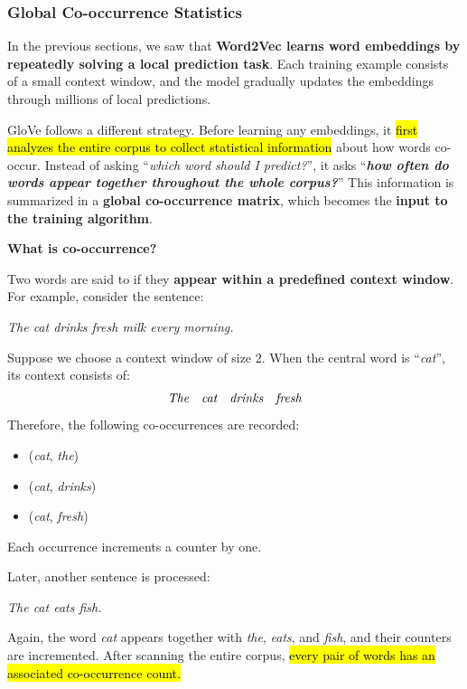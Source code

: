 \subsubsection{Global Co-occurrence Statistics}\label{sec:global-co-occurrence-statistics}

In the previous sections, we saw that \textbf{Word2Vec learns word embeddings by repeatedly solving a local prediction task}. Each training example consists of a small context window, and the model gradually updates the embeddings through millions of local predictions.

\highspace
GloVe follows a different strategy. Before learning any embeddings, it \hl{first analyzes the entire corpus to collect statistical information} about how words co-occur. Instead of asking ``\emph{which word should I predict?}'', it asks ``\emph{\textbf{how often do words appear together throughout the whole corpus?}}'' This information is summarized in a \textbf{global co-occurrence matrix}, which becomes the \textbf{input to the training algorithm}.

\highspace
\begin{flushleft}
    \textcolor{Green3}{ \textbf{What is co-occurrence?}}
\end{flushleft}
Two words are said to  if they \textbf{appear within a predefined context window}. For example, consider the sentence:
\begin{center}
    \emph{The cat drinks fresh milk every morning.}
\end{center}
Suppose we choose a context window of size $2$. When the central word is ``\emph{cat}'', its context consists of:
\begin{equation*}
    \emph{The} \quad \emph{cat} \quad \emph{drinks} \quad \emph{fresh}
\end{equation*}
Therefore, the following co-occurrences are recorded:
\begin{itemize}
    \item (\emph{cat}, \emph{the})
    \item (\emph{cat}, \emph{drinks})
    \item (\emph{cat}, \emph{fresh})
\end{itemize}
Each occurrence increments a counter by one.

\highspace
Later, another sentence is processed:
\begin{center}
    \emph{The cat eats fish.}
\end{center}
Again, the word \emph{cat} appears together with \emph{the}, \emph{eats}, and \emph{fish}, and their counters are incremented. After scanning the entire corpus, \hl{every pair of words has an associated co-occurrence count.}

